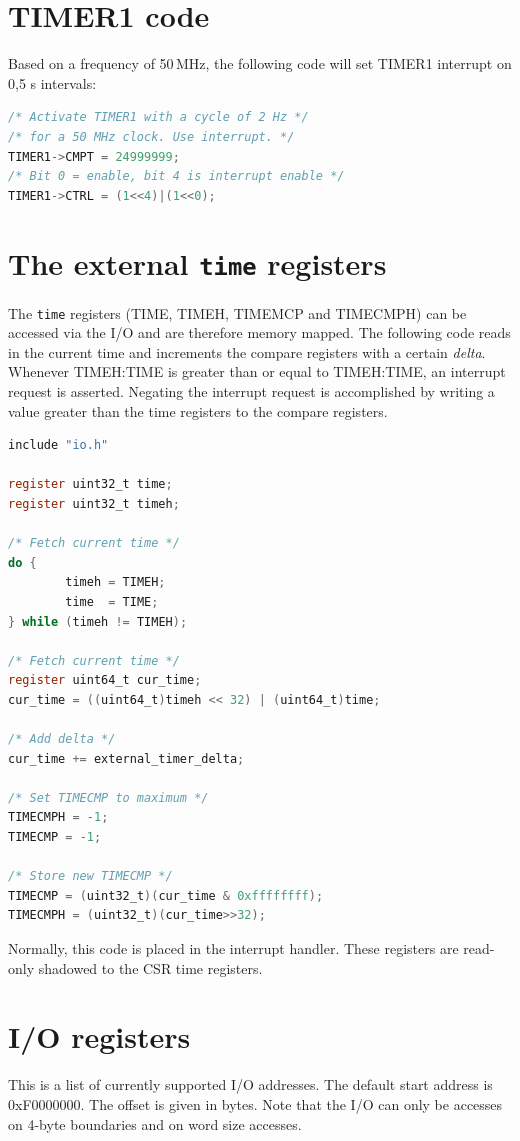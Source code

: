 \documentclass[12pt]{article}
\begin{document}
\section{TIMER1 code}
Based on a frequency of 50$\,$MHz, the following code will set TIMER1 interrupt on 0,5 s intervals:

\begin{lstlisting}[language=C]
/* Activate TIMER1 with a cycle of 2 Hz */
/* for a 50 MHz clock. Use interrupt. */
TIMER1->CMPT = 24999999;
/* Bit 0 = enable, bit 4 is interrupt enable */
TIMER1->CTRL = (1<<4)|(1<<0);
\end{lstlisting}

\section{The external \texttt{time} registers}
The \texttt{time} registers (TIME, TIMEH, TIMEMCP and TIMECMPH) can be accessed via the I/O and are therefore memory mapped. The following code reads in the current time and increments the compare registers with a certain \emph{delta}. Whenever TIMEH:TIME is greater than or equal to TIMEH:TIME, an interrupt request is asserted. Negating the interrupt request is accomplished by writing a value greater than the time registers to the compare registers.

\begin{lstlisting}[language=C]
include "io.h"

register uint32_t time;
register uint32_t timeh;

/* Fetch current time */
do {
        timeh = TIMEH;
        time  = TIME;
} while (timeh != TIMEH);

/* Fetch current time */
register uint64_t cur_time;
cur_time = ((uint64_t)timeh << 32) | (uint64_t)time;

/* Add delta */
cur_time += external_timer_delta;

/* Set TIMECMP to maximum */
TIMECMPH = -1;
TIMECMP = -1;

/* Store new TIMECMP */
TIMECMP = (uint32_t)(cur_time & 0xffffffff);
TIMECMPH = (uint32_t)(cur_time>>32);
\end{lstlisting}

Normally, this code is placed in the interrupt handler. These registers are read-only shadowed to the CSR time registers.

\section{I/O registers}
\label{sec:ioregisters}
This is a list of currently supported I/O addresses. 
The default start address is 0xF0000000. The offset is given in bytes. Note that the I/O can only be accesses on 4-byte boundaries and on word size accesses.
\end{document}
